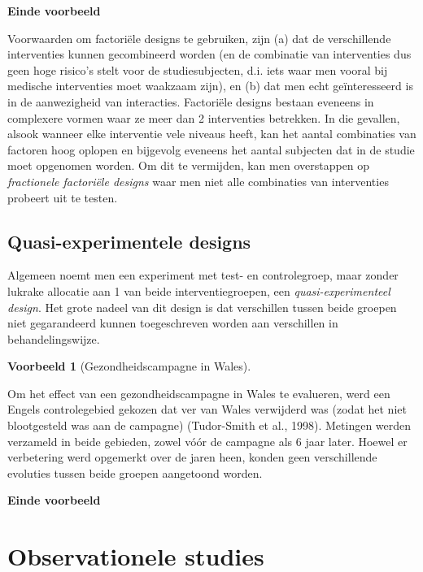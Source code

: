 \documentclass[
  12pt,dutch,coursenotes]{book}
\theoremstyle{definition}
\theoremstyle{definition}
\newtheorem{example}{Voorbeeld}[chapter]
\theoremstyle{definition}
\theoremstyle{definition}
\theoremstyle{remark}
\begin{document}
\textbf{Einde voorbeeld}

Voorwaarden om factoriële designs te gebruiken, zijn (a) dat de
verschillende interventies kunnen gecombineerd worden (en de combinatie van
interventies dus geen hoge risico's stelt voor de studiesubjecten, d.i. iets waar men vooral bij medische interventies moet waakzaam zijn), en (b) dat men
echt geïnteresseerd is in de aanwezigheid van interacties. Factoriële designs bestaan eveneens in complexere vormen waar ze meer dan 2 interventies betrekken. In die gevallen, alsook wanneer elke interventie vele niveaus heeft, kan het aantal combinaties van factoren hoog oplopen en bijgevolg eveneens het aantal subjecten dat in de studie moet opgenomen worden. Om dit te vermijden, kan men overstappen op \emph{fractionele factoriële designs} waar men niet alle combinaties van interventies probeert uit te testen.

\hypertarget{quasi-experimentele-designs}{%
\subsection{Quasi-experimentele designs}\label{quasi-experimentele-designs}}

Algemeen noemt men een experiment met test- en controlegroep, maar zonder
lukrake allocatie aan 1 van beide interventiegroepen, een \emph{quasi-experimenteel design}. Het grote nadeel van dit design is dat
verschillen tussen beide groepen niet gegarandeerd kunnen toegeschreven
worden aan verschillen in behandelingswijze.

\begin{example}[Gezondheidscampagne in Wales]
\protect\hypertarget{exm:unnamed-chunk-81}{}{\label{exm:unnamed-chunk-81} {} }
\end{example}

Om het effect van een gezondheidscampagne in Wales te evalueren, werd
een Engels controlegebied gekozen dat ver van Wales verwijderd was (zodat
het niet blootgesteld was aan de campagne) (Tudor-Smith et al., 1998).
Metingen werden verzameld in beide gebieden, zowel vóór de campagne
als 6 jaar later. Hoewel er verbetering werd opgemerkt over de jaren heen,
konden geen verschillende evoluties tussen beide groepen aangetoond worden.

\textbf{Einde voorbeeld}

\hypertarget{sec:observational}{%
\section{Observationele studies}\label{sec:observational}}
\end{document}
